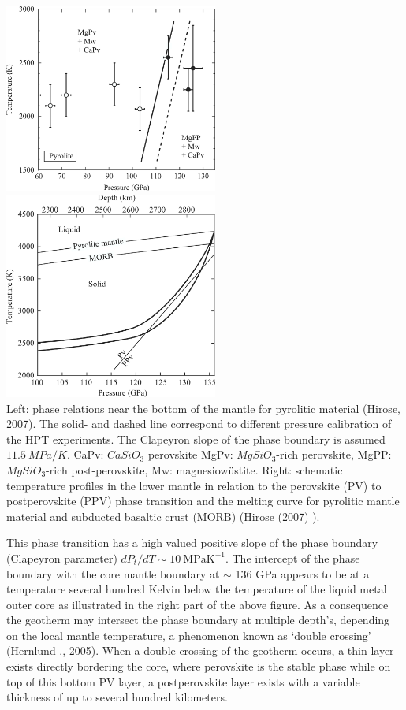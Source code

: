 \begin{center}
\includegraphics[width=7cm]{images/gravity/hirose_fig1}
\includegraphics[width=7cm]{images/gravity/hirose_fig5}\\
{\captionfont
Left: phase relations near the bottom of the mantle for 
          pyrolitic material (Hirose, 2007).
          The solid- and dashed line correspond to different
          pressure calibration of the HPT experiments. 
          The Clapeyron slope of the phase boundary is 
          assumed $11.5 ~MPa/K$. 
          CaPv: $CaSiO_3$ perovskite
          MgPv: $MgSiO_3$-rich perovskite,
          MgPP: $MgSiO_3$-rich post-perovskite,
          Mw: magnesiow\"{u}stite.
       Right: schematic temperature profiles in the lower mantle 
       in relation to
       the perovskite (PV) to postperovskite (PPV) phase transition
       and the melting curve for pyrolitic mantle material and 
       subducted basaltic crust (MORB) (Hirose \etal (2007) \cite{hibl07}).
}
\end{center}


This phase transition has a high valued
positive slope of the phase boundary (Clapeyron parameter) 
$dP_t/dT \sim 10 ~ \mathrm{MPa K^{-1}}$. 
The intercept of the phase boundary with the core mantle boundary
at $\sim$ 136 GPa appears to be at a temperature several hundred Kelvin
below the temperature of the liquid metal outer core as illustrated in
the right part of the above figure.
As a consequence the geotherm may intersect the phase boundary 
at multiple depth's,
depending on the local mantle temperature, 
a phenomenon known as `double crossing' (Hernlund \etal., 2005).
When a double crossing of the geotherm occurs, 
a thin layer exists directly bordering the core, where perovskite is the stable
phase while on top of this bottom PV layer, a postperovskite layer 
exists with a variable thickness of up to several hundred
kilometers.  

